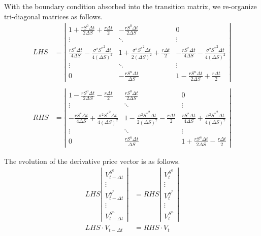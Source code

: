 \documentclass{article}
\begin{document}
With the boundary condition absorbed into the transition matrix, we re-organize tri-diagonal matrices as follows.
\begin{align}
    LHS &= \left| \begin{matrix}
        1 + \frac{r S^{0} \Delta t}{2 \Delta S} + \frac{r \Delta t}{2} & - \frac{r S^{0} \Delta t}{2 \Delta S} & 0 \\
        \vdots & \ddots & \vdots \\
        \frac{r S^* \Delta t}{4 \Delta S} - \frac{\sigma^2 {S^*}^2 \Delta t}{4 (\Delta S)^2} & 1 + \frac{\sigma^2 {S^*}^2 \Delta t}{2 (\Delta S)^2} + \frac{r \Delta t}{2} & -\frac{r S^* \Delta t}{4 \Delta S} - \frac{\sigma^2 {S^*}^2 \Delta t}{4 (\Delta S)^2} \\
        \vdots & \ddots & \vdots \\
        0 & -\frac{r S^{n} \Delta t}{\Delta S} & 1 - \frac{r S^{n} \Delta t}{2 \Delta S} + \frac{r \Delta t}{2}
    \end{matrix} \right| \\ \nonumber \\
    RHS &= \left| \begin{matrix}
        1 - \frac{r S^{0} \Delta t}{2 \Delta S} - \frac{r \Delta t}{2} & \frac{r S^{0} \Delta t}{2 \Delta S} & 0 \\
        \vdots & \ddots & \vdots \\
        - \frac{r S^* \Delta t}{4 \Delta S} + \frac{\sigma^2 {S^*}^2 \Delta t}{4 (\Delta S)^2} & 1 - \frac{\sigma^2 {S^*}^2 \Delta t}{2 (\Delta S)^2} - \frac{r \Delta t}{2} & \frac{r S^* \Delta t}{4 \Delta S} + \frac{\sigma^2 {S^*}^2 \Delta t}{4 (\Delta S)^2}\\
        \vdots & \ddots & \vdots \\
        0 & \frac{r S^{n} \Delta t}{\Delta S} & 1 + \frac{r S^{n} \Delta t}{2 \Delta S} - \frac{r \Delta t}{2}
    \end{matrix} \right|
\end{align}

The evolution of the derivative price vector is as follows.
\begin{align}
    LHS \left| \begin{matrix} V_{t - \Delta t}^{S^0} \\ \vdots \\ V_{t - \Delta t}^{S^*} \\ \vdots \\ V_{t - \Delta t}^{S^n} \end{matrix}\right| &= RHS \left| \begin{matrix} V_{t}^{S^0} \\ \vdots \\ V_{t}^{S^*} \\ \vdots \\ V_{t}^{S^n} \end{matrix}\right| \\
    LHS \cdot V_{t - \Delta t} &= RHS \cdot V_{t}
\end{align}
\end{document}
